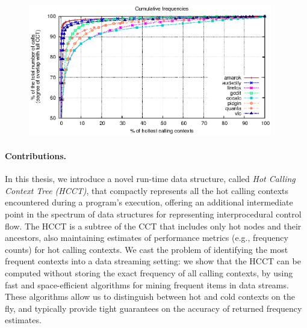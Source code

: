 \ifdefined\noauthorea
\begin{figure}[hb]
\begin{center}
\includegraphics[width=0.95\textwidth]{figures/hcct-skewness/hcct-skewness.eps}
\caption{\protect}
\end{center}
\end{figure}
\fi

\paragraph*{Contributions.} In this thesis, we introduce a novel run-time data structure, called {\em Hot Calling Context Tree (HCCT)}, that compactly represents all the hot calling contexts encountered during a program's execution, offering an additional intermediate point in the spectrum of data structures for representing interprocedural control flow. The HCCT is a subtree of the CCT that includes only hot nodes and their ancestors, also maintaining estimates of performance metrics (e.g., frequency counts) for hot calling contexts. We cast the problem of identifying the most frequent contexts into a data streaming setting: we show that the HCCT can be computed without storing the exact frequency of all calling contexts, by using fast and space-efficient algorithms for mining frequent items in data streams. These algorithms allow us to distinguish between hot and cold contexts on the fly, and typically provide tight guarantees on the accuracy of returned frequency estimates.



